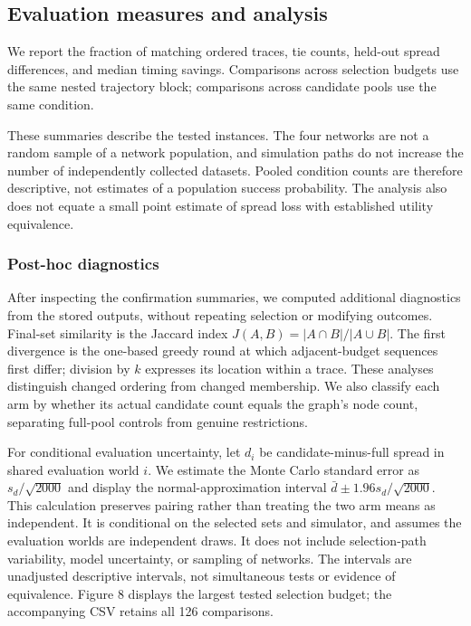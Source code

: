 \documentclass[smallextended]{svjour3}
\begin{document}
\subsection{Evaluation measures and analysis}

We report the fraction of matching ordered traces, tie counts, held-out spread differences, and median timing savings. Comparisons across selection budgets use the same nested trajectory block; comparisons across candidate pools use the same condition.

These summaries describe the tested instances. The four networks are not a random sample of a network population, and simulation paths do not increase the number of independently collected datasets. Pooled condition counts are therefore descriptive, not estimates of a population success probability. The analysis also does not equate a small point estimate of spread loss with established utility equivalence.


\subsubsection{Post-hoc diagnostics}

After inspecting the confirmation summaries, we computed additional diagnostics from the stored outputs, without repeating selection or modifying outcomes. Final-set similarity is the Jaccard index \(J(A,B)=|A\cap B|/|A\cup B|\). The first divergence is the one-based greedy round at which adjacent-budget sequences first differ; division by \(k\) expresses its location within a trace. These analyses distinguish changed ordering from changed membership. We also classify each arm by whether its actual candidate count equals the graph's node count, separating full-pool controls from genuine restrictions.

For conditional evaluation uncertainty, let \(d_{i}\) be candidate-minus-full spread in shared evaluation world \(i\). We estimate the Monte Carlo standard error as \(s_{d}/\sqrt{2000}\) and display the normal-approximation interval \(\bar{d}\pm 1.96s_{d}/\sqrt{2000}\). This calculation preserves pairing rather than treating the two arm means as independent. It is conditional on the selected sets and simulator, and assumes the evaluation worlds are independent draws. It does not include selection-path variability, model uncertainty, or sampling of networks. The intervals are unadjusted descriptive intervals, not simultaneous tests or evidence of equivalence. Figure 8 displays the largest tested selection budget; the accompanying CSV retains all 126 comparisons.
\end{document}
